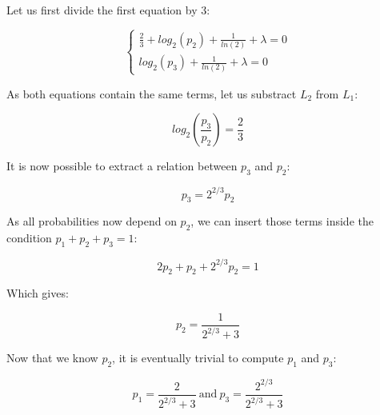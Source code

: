 \documentclass{article}
\begin{document}
Let us first divide the first equation by 3:

$$ 
\begin{cases}
\frac{2}{3} + log_2(p_2) + \frac{1}{ln(2)} + \lambda = 0\\
log_2(p_3) + \frac{1}{ln(2)} + \lambda = 0
\end{cases}
$$

As both equations contain the same terms, let us substract $L_2$ from $L_1$:

$$log_2(\frac{p_3}{p_2}) = \frac{2}{3}$$

It is now possible to extract a relation between $p_3$ and $p_2$:

$$ p_3 = 2^{2/3} p_2$$

As all probabilities now depend on $p_2$, we can insert those terms inside the condition $p_1 + p_2 + p_3 = 1$:

$$2 p_2 + p_2 + 2^{2/3}p_2 = 1$$

Which gives:

$$\boxed{p_2 = \frac{1}{2^{2/3}+3}}$$

Now that we know $p_2$, it is eventually trivial to compute $p_1$ and $p_3$:

$$\boxed{p_1 = \frac{2}{2^{2/3}+3}\ \text{and}\ p_3 = \frac{2^{2/3}}{2^{2/3}+3}}$$
\end{document}
